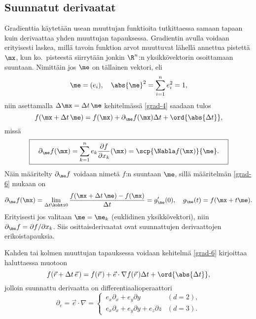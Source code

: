 \subsection{Suunnatut derivaatat}

Gradienttia käytetään usean muuttujan funktioita tutkittaessa samaan tapaan kuin derivaattaa
yhden muuttujan tapauksessa. Gradientin avulla voidaan erityisesti laskea, millä tavoin
funktion arvot muuttuvat lähellä annettua pistettä $\mx$, kun ko.\ pisteestä siirrytään
jonkin $\R^n$:n yksikkövektorin osoittamaan suuntaan. Nimittäin jos $\me$ on tällainen vektori,
eli
\[ 
\me = (e_i), \quad \abs{\me}^2 = \sum_{i=1}^n e_i^2 = 1, 
\]
niin asettamalla $\Delta\mx = \Delta t\,\me$ kehitelmässä \eqref{grad-4} saadaan tulos
\begin{equation} \label{grad-6}
f(\mx+\Delta t\,\me)=f(\mx)+\partial_{\me}f(\mx)\Delta t+\ord{\abs{\Delta t}},
\end{equation}
missä 
\[
\boxed{\quad \partial_{\me}f(\mx)
          =\sum_{k=1}^n e_k\frac{\partial f}{\partial x_k}(\mx)=\scp{\Nabla f(\mx)}{\me}. \quad}
\]
Näin määritelty $\partial_{\me}f$ voidaan nimetä $f$:n  suuntaan
$\me$, sillä määritelmän \eqref{grad-6} mukaan on
\[
\partial_{\me}f(\mx)=\lim_{\Delta t\kohti 0}\frac{f(\mx+\Delta t\,\me)-f(\mx)}{\Delta t} 
                    = g'_{\me}(0), \quad g_{\me}(t) = f(\mx + t\me). 
\]
Erityisesti jos valitaan $\me=\me_k$ (euklidinen yksikkövektori), niin 
$\partial_{\me}f = \partial f/\partial x_k$. Siis osittaisderivaatat ovat suunnattujen 
derivaattojen erikoistapauksia.

Kahden tai kolmen muuttujan tapauksessa voidaan kehitelmä \eqref{grad-6} kirjoittaa haluttaessa
muotoon
\[
f(\vec r+\Delta t\,\vec e\,)=f(\vec r\,)+\vec e\cdot\nabla f(\vec r\,)\Delta t+\ord{\abs{\Delta t}},
\]
jolloin suunnattu derivaatta on differentiaalioperaattori
\[
\partial_e = \vec e\cdot\nabla=\begin{cases}
\,e_x\partial_x+e_y\partial y &(d=2), \\
\,e_x\partial_x+e_y\partial y+e_z\partial z &(d=3). 
\end{cases}
\]

